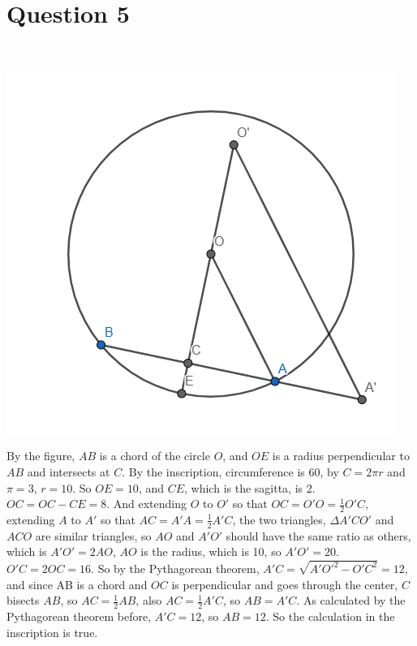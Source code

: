\documentclass{article}
\begin{document}
\newpage

\section*{Question 5}

~

\includegraphics[scale=0.8]{HW_0207/HW_0207.png}

By the figure, $AB$ is a chord of the circle $O$, and $OE$ is a radius perpendicular to $AB$ and intersects at $C$. By the inscription, circumference is 60, by $C=2\pi r$ and $\pi=3$, $r=10$. So $OE=10$, and $CE$, which is the sagitta, is 2. $OC=OC-CE=8$. And extending $O$ to $O'$ so that $OC=O'O=\frac{1}{2}O'C$, extending $A$ to $A'$ so that $AC=A'A=\frac{1}{2}A'C$, the two triangles, $\Delta A'CO'$ and $ACO$ are similar triangles, so $AO$ and $A'O'$ should have the same ratio as others, which is $A'O'=2AO$, $AO$ is the radius, which is 10, so $A'O'=20$. $O'C=2OC=16$. So by the Pythagorean theorem, $A'C=\sqrt{{A'O'}^2-{O'C}^2}=12$, and since AB is a chord and $OC$ is perpendicular and goes through the center, $C$ bisects $AB$, so $AC=\frac{1}{2}AB$, also $AC=\frac{1}{2}A'C$, so $AB=A'C$. As calculated by the Pythagorean theorem before, $A'C=12$, so $AB=12$. So the calculation in the inscription is true.
\end{document}
